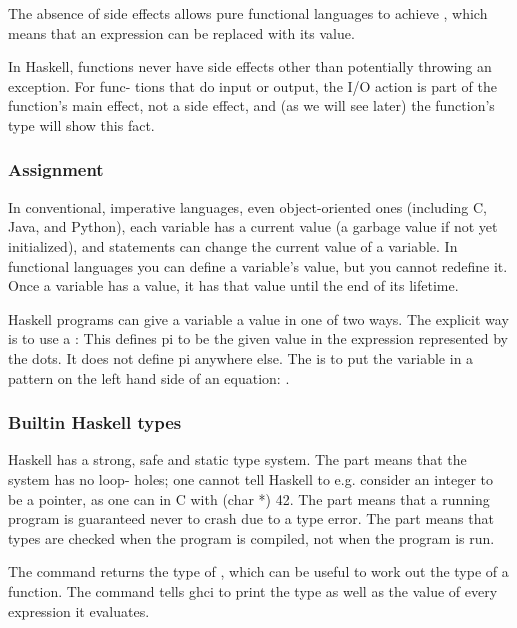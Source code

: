 The absence of side effects allows pure functional
languages to achieve , which
means that an expression can be replaced with its
value. 

In Haskell, functions never have side effects other
than potentially throwing an exception. For func-
tions that do input or output, the I/O action is part
of the function’s main effect, not a side effect, and
(as we will see later) the function’s type will show
this fact.

\subsubsection{Assignment}
In conventional, imperative languages, even
object-oriented ones (including C, Java, and
Python), each variable has a current value
(a garbage value if not yet initialized), and
 statements can change the current
value of a variable.
In functional languages you can define a variable’s value, but
you cannot redefine it. Once a variable has
a value, it has that value until the end of its
lifetime.

Haskell programs can give a variable a value in one
of two ways.
The explicit way is to use a :
This defines pi to be the given value in the expression represented by the dots. It does not define pi
anywhere else.
The  is to put the variable in a pattern
on the left hand side of an equation:
.

\subsubsection{Builtin Haskell types}
Haskell has a strong, safe and static type system.
The  part means that the system has no loop-
holes; one cannot tell Haskell to e.g. consider an
integer to be a pointer, as one can in C with (char
*) 42.
The  part means that a running program is
guaranteed never to crash due to a type error.
The  part means that types are checked when
the program is compiled, not when the program is
run. 

The command  returns the type of , which can be useful to work out the type of a function. The
command  tells ghci to print the type as
well as the value of every expression it evaluates.

